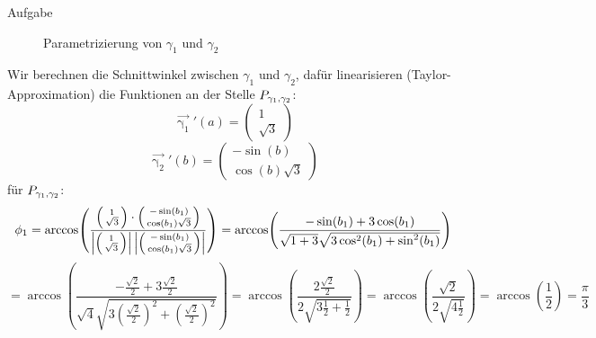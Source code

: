 \documentclass{scrartcl}
\begin{document}
\begin{section}{Aufgabe}
\begin{itemize}
\begin{figure}[H]
\begin{tikzpicture}[scale=3.5]
\end{tikzpicture}
\caption{Parametrizierung von $\gamma_1$ und $\gamma_2$}
\end{figure}
Wir berechnen die Schnittwinkel zwischen $\gamma_1$ und $\gamma_2$, dafür linearisieren (Taylor-Approximation) die Funktionen an der Stelle $\schnt{\gamma_1}{\gamma_2}{P}$:\\
\[\vec{\upgamma_1}'(a)=\begin{pmatrix}1\\\sqrt{3}\end{pmatrix}\]
\[\vec{\upgamma_2}'(b)=\begin{pmatrix}-\sin(b)\\\cos(b)\sqrt{3}\end{pmatrix}\]
für $\schnt{\gamma_1}{\gamma_2}{P}$:
\[\phi_1=\arccos(\frac{\begin{psmallmatrix}1\\\sqrt{3}\end{psmallmatrix}\cdot \begin{psmallmatrix}-\sin(b_1)\\\cos(b_1)\sqrt{3}\end{psmallmatrix}}{\left|\begin{psmallmatrix}1\\\sqrt{3}\end{psmallmatrix}\right|\left|\begin{psmallmatrix}-\sin(b_1)\\\cos(b_1)\sqrt{3}\end{psmallmatrix}\right|})
=\arccos(\frac{-\sin(b_1)+3\cos(b_1)}{\sqrt{1+3} \sqrt{3 \cos[2](b_1)+\sin[2](b_1)}})\]
\[=\arccos(\frac{-\frac{\sqrt{2}}{2}+3\frac{\sqrt{2}}{2}}{\sqrt{4} \sqrt{3 (\frac{\sqrt{2}}{2})^2+(\frac{\sqrt{2}}{2})^2}})=
\arccos(\frac{2\frac{\sqrt{2}}{2}}{2 \sqrt{3 \frac{1}{2}+\frac{1}{2}}})
=\arccos(\frac{\sqrt{2}}{2 \sqrt{4\frac{1}{2}}})
=\arccos(\frac{1}{2})=\frac{\pi}{3}\]


\end{itemize}
\end{section}
\end{document}
